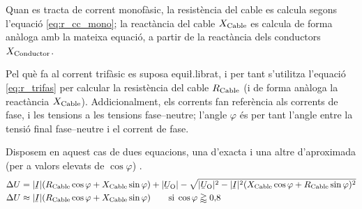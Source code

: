 Quan es tracta de corrent monof\`{a}sic, la resist\`{e}ncia del cable es calcula segons l'equaci\'{o}
\eqref{eq:r_cc_mono}; la react\`{a}ncia del cable $X_\mathrm{Cable}$ es calcula de forma an\`{a}loga
amb la mateixa equaci\'{o}, a partir de la react\`{a}ncia dels conductors $X_\mathrm{Conductor}$.

Pel qu\`{e} fa al corrent trif\`{a}sic es suposa equi{\l.l}ibrat, i per tant s'utilitza l'equaci\'{o}
\eqref{eq:r_trifas} per calcular la resist\`{e}ncia del cable $R_\mathrm{Cable}$ (i de forma
an\`{a}loga la react\`{a}ncia $X_\mathrm{Cable}$). Addicionalment, els corrents fan refer\`{e}ncia als
corrents de fase, i les tensions a les tensions fase--neutre; l'angle $\varphi$ \'{e}s per
tant l'angle entre la tensi\'{o} final fase--neutre i el corrent de fase.

Disposem en aquest cas de dues equacions, una d'exacta i una altre d'aproximada (per a valors elevats de $\cos \varphi$) .
\begin{subequations}
\begin{align}
   \Delta U &= |\cmplx{I}| ( R\ped{Cable} \cos \varphi + X\ped{Cable} \sin \varphi) + |\cmplx{U}\ped{O}| - \sqrt{|\cmplx{U}\ped{O}|^2 - |\cmplx{I}|^2 ( X\ped{Cable} \cos \varphi + R\ped{Cable} \sin \varphi )^2} \label{eq:cdt_trif_exact} \\
   \Delta U &\approx |\cmplx{I}| ( R\ped{Cable} \cos \varphi + X\ped{Cable} \sin \varphi) \qquad \text{si} \; \cos \varphi \gtrapprox 0{,}8 \label{eq:cdt_trif_aprox}
\end{align}
\end{subequations}


